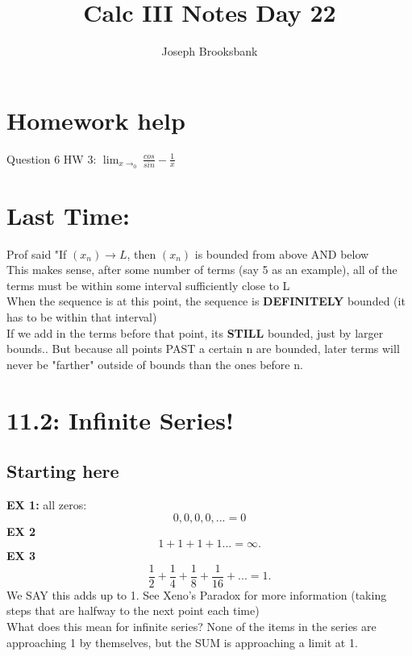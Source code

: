 \documentclass[]{report}
\title{Calc III Notes Day 22}
\author{Joseph Brooksbank}
\begin{document}
\maketitle
\section*{Homework help}
Question 6 HW 3: 
$\lim_{x\to_0}  \frac{cos}{sin} - \frac{1}{x} $

\section*{Last Time:}
Prof said "If $(x_n) \to L$, then $(x_n)$ is bounded from above AND below
\\
This makes sense, after some number of terms (say 5 as an example), all of the terms must be within some interval sufficiently close to L 
\\ 
When the sequence is at this point, the sequence is \textbf{DEFINITELY} bounded (it has to be within that interval)
\\
If we add in the terms before that point, its \textbf{STILL} bounded, just by larger bounds.. But because all points PAST a certain n are bounded, later terms will never be "farther" outside of bounds than the ones before n.
\\
\noindent{}


\section*{11.2: Infinite Series!}
\noindent{}
    \subsection*{Starting here}
    \textbf{EX 1:} all zeros:
    \[
    0, 0, 0, 0,... = 0
    \] 
    \textbf{EX 2}
    \[
    1 + 1 + 1 + 1...= \infty
    .\] 
    \textbf{EX 3}
    \[
    \frac{1}{2} + \frac{1}{4} + \frac{1}{8} + \frac{1}{16} + ... = 1
    .\] We SAY this adds up to 1. See Xeno's Paradox for more information (taking steps that are halfway to the next point each time)  
    \\ 
    What does this mean for infinite series?
    None of the items in the series are approaching 1 by themselves, but the SUM is approaching a limit at 1.
    \\
    \noindent{}
\end{document}
